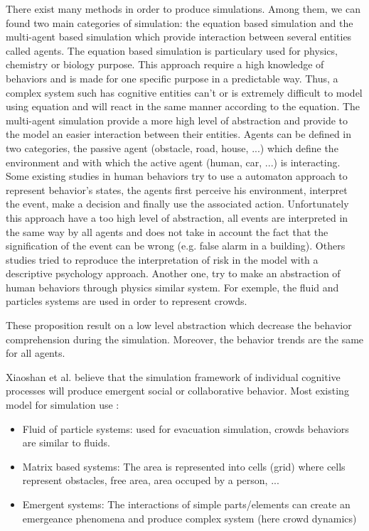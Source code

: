             There exist many methods in order to produce simulations. Among them, we can found two main categories of simulation: the equation based simulation and the multi-agent based simulation which provide interaction between several entities called agents. The equation based simulation is particulary used for physics, chemistry or biology purpose. This approach require a high knowledge of behaviors and is made for one specific purpose in a predictable way. Thus, a complex system such has cognitive entities can't or is extremely difficult to model using equation and will react in the same manner according to the equation. The multi-agent simulation provide a more high level of abstraction and provide to the model an easier interaction between their entities. Agents can be defined in two categories, the passive agent (obstacle, road, house, ...) which define the environment and with which the active agent (human, car, ...) is interacting. Some existing studies in human behaviors try to use a automaton approach to represent behavior's states, the agents first perceive his environment, interpret the event, make a decision and finally use the associated action. Unfortunately this approach have a too high level of abstraction, all events are interpreted in the same way by all agents and does not take in account the fact that the signification of the event can be wrong (e.g. false alarm in a building).\cite{modeling2008} Others studies tried to reproduce the interpretation of risk in the model with a descriptive psychology approach.\cite{review2014}
            Another one, try to make an abstraction of human behaviors through physics similar system. For exemple, the fluid and particles systems are used in order to represent crowds. \cite{multi-agent2007}

            These proposition result on a low level abstraction which decrease the behavior comprehension during the simulation. Moreover, the behavior trends are the same for all agents.


            Xiaoshan et al. believe that the simulation framework of individual cognitive processes will produce emergent social or collaborative behavior.\cite{multi-agent2007} 
            Most existing model for simulation use :
            \begin{itemize}
                \item Fluid of particle systems: used for evacuation simulation, crowds behaviors are similar to fluids.
                \item Matrix based systems: The area is represented into cells (grid) where cells represent obstacles, free area, area occuped by a person, ...
                \item Emergent systems: The interactions of simple parts/elements can create an emergeance phenomena and produce complex system (here crowd dynamics)
            \end{itemize}


